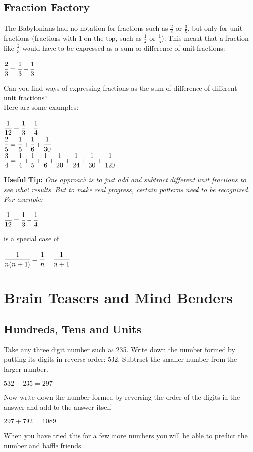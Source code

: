 	\subsection{Fraction Factory}
	The Babylonians had no notation for fractions such as $\frac{2}{3}$ or $\frac{3}{5}$, but only for unit fractions (fractions with 1 on the top, such as $\frac{1}{2}$ or $\frac{1}{5}$). This meant that a fraction like $\frac{2}{3}$ would have to be expressed as a sum or difference of unit fractions:
	\begin{center}
	$\cfrac{2}{3} = \cfrac{1}{3} + \cfrac{1}{3}$
	\end{center}
	Can you find ways of expressing fractions as the sum of difference of different unit fractions?\\
	Here are some examples:
	\begin{center}
	$\cfrac{1}{12} = \cfrac{1}{3} - \cfrac{1}{4}$\linebreak\\
	
	$\cfrac{2}{5} = \cfrac{1}{5} + \cfrac{1}{6} + \cfrac{1}{30}$\linebreak\\
	
	$\cfrac{3}{4} = \cfrac{1}{4} + \cfrac{1}{5} + \cfrac{1}{6} + \cfrac{1}{20} + \cfrac{1}{24} + \cfrac{1}{30} + \cfrac{1}{120}$
	\end{center}
	\textbf{Useful Tip:} \emph{One approach is to just add and subtract different unit fractions to see what results. But to make real progress, certain patterns need to be recognized. For example:}
	\begin{center}
	$\cfrac{1}{12} = \cfrac{1}{3} - \cfrac{1}{4}$\\
	\end{center}
	is a special case of
	\begin{center}
	$\cfrac{1}{n(n+1)} = \cfrac{1}{n} - \cfrac{1}{n+1}$
	\end{center}
	
	
\section{Brain Teasers and Mind Benders}
	\subsection{Hundreds, Tens and Units}
	Take any three digit number such as 235. Write down the number formed by putting its digits in reverse order: 532. Subtract the smaller number from the larger number.
	\begin{center}
	$532 - 235 = 297$\\
	\end{center}
	Now write down the number formed by reversing the order of the digits in the answer and add to the answer itself.
	\begin{center}
	$297 + 792 = 1089$\\
	\end{center}
	When you have tried this for a few more numbers you will be able to predict the number and baffle friends.
	
